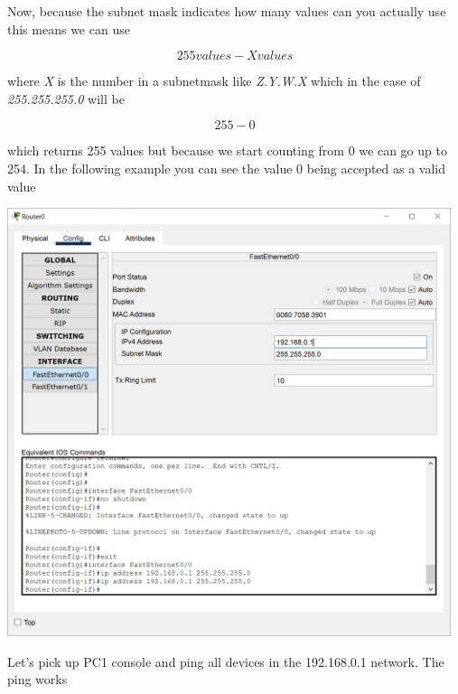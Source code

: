 \documentclass[a4paper,12pt]{book}
\begin{document}
\noindent Now, because the subnet mask indicates how many values can you actually use this means we can use

\[ 255 values - X values \]

\noindent where \emph{X} is the number in a subnetmask like \emph{Z.Y.W.X} which in the case of \emph{255.255.255.0} will be

\[ 255 - 0\]

\noindent which returns 255 values but because we start counting from 0 we can go up to 254.
In the following example you can see the value 0 being accepted as a valid value \newline 

\noindent \includegraphics[width=13cm]{./step-by-step/17.PNG}
\clearpage


\noindent Let's pick up PC1 console and ping all devices in the 192.168.0.1 network. The ping works \newline
\end{document}
